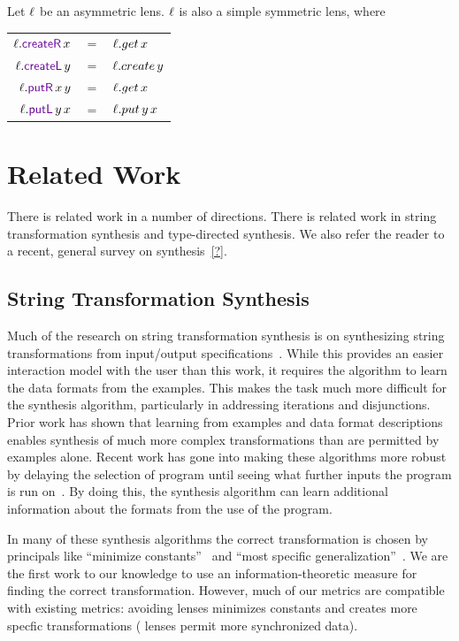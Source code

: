 \documentclass[acmsmall,screen,anonymous]{acmart}
\begin{document}
\begin{theorem}
  Let $\mathit{\ell}$ be an asymmetric lens. $\mathit{\ell}$ is also a simple symmetric lens,
  where
  \begin{center}
    \begin{tabular}{rcl}
      $\Lens.\CreateROf{x}$ & $=$ & $\mathit{\ell}.get \, x$\\
      $\Lens.\CreateLOf{y}$ & $=$ & $\mathit{\ell}.create \, y$\\
      $\Lens.\PutROf{x}{y}$ & $=$ & $\mathit{\ell}.get \, x$\\
      $\Lens.\PutLOf{y}{x}$ & $=$ & $\mathit{\ell}.put \, y \, x$
    \end{tabular}
  \end{center}
\end{theorem}


\section{Related Work}
\label{sec:related}
There is related work in a number of directions. There is related work in string
transformation synthesis and type-directed synthesis. We also refer the reader
to a recent, general survey on synthesis~\ref{?}.


\subsection{String Transformation Synthesis}
Much of the research on string transformation synthesis is on synthesizing
string transformations from input/output
specifications~\cite{flashfill,flashextract,?}. While this provides an easier
interaction model with the user than this work, it requires the algorithm to
learn the data formats from the examples. This makes the task much more
difficult for the synthesis algorithm, particularly in addressing iterations and
disjunctions. Prior work has shown that learning from examples and data format
descriptions enables synthesis of much more complex transformations than are
permitted by examples alone. Recent work has gone into making these algorithms
more robust by delaying the selection of program until seeing what further
inputs the program is run on~\cite{?}. By doing this, the synthesis algorithm
can learn additional information about the formats from the use of the program.

In many of these synthesis algorithms the correct transformation is chosen by
principals like ``minimize constants''~\cite{?,?,?} and ``most specific
generalization''~\cite{?,?,?}. We are the first work to our knowledge to use an
information-theoretic measure for finding the correct transformation. However,
much of our metrics are compatible with existing metrics: avoiding \Disconnect
lenses minimizes constants and creates more specfic transformations (\Disconnect
lenses permit more synchronized data).
\end{document}
